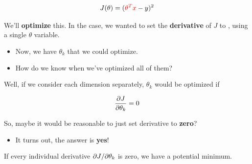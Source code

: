         \begin{equation}
            J(\theta) = (\textcolor{red}{ \theta^T x  } - y )^2
        \end{equation}
        
        We'll \textbf{optimize} this. In the  case, we wanted to set the \textbf{derivative} of $J$ to , using a single $\theta$ variable.
        
        \begin{itemize}
            \item Now, we have  $\theta_k$ that we could optimize.

            \item How do we know when we've optimized all of them?
        \end{itemize} 

        Well, if we consider each dimension separately, $\theta_k$ would be optimized if 

        \begin{equation}
            \frac{\partial J}{\partial \theta_k} = 0
        \end{equation}
        
        
        So, maybe it would be reasonable to just set  derivative to \textbf{zero}? 
        
        \begin{itemize}
            \item It turns out, the answer is \textbf{yes}! 
        \end{itemize}
        
        
        If every individual derivative ${\partial J}/{\partial \theta_k}$ is zero, we have a potential minimum.\\
        
